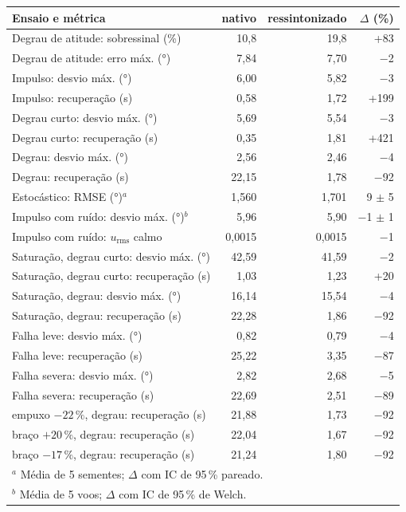 \begin{tabular}{lrrr}
\toprule
Ensaio e métrica & nativo & ressintonizado & $\Delta$ (\%) \\
\midrule
Degrau de atitude: sobressinal (\%) & 10,8 & 19,8 & +83 \\
Degrau de atitude: erro máx. (\si{\degree}) & 7,84 & 7,70 & $-$2 \\
Impulso: desvio máx. (\si{\degree}) & 6,00 & 5,82 & $-$3 \\
Impulso: recuperação (\si{\second}) & 0,58 & 1,72 & +199 \\
Degrau curto: desvio máx. (\si{\degree}) & 5,69 & 5,54 & $-$3 \\
Degrau curto: recuperação (\si{\second}) & 0,35 & 1,81 & +421 \\
Degrau: desvio máx. (\si{\degree}) & 2,56 & 2,46 & $-$4 \\
Degrau: recuperação (\si{\second}) & 22,15 & 1,78 & $-$92 \\
Estocástico: RMSE (\si{\degree})$^{a}$ & 1,560 & 1,701 & 9 $\pm$ 5 \\
Impulso com ruído: desvio máx. (\si{\degree})$^{b}$ & 5,96 & 5,90 & $-$1 $\pm$ 1 \\
Impulso com ruído: $u_\mathrm{rms}$ calmo & 0,0015 & 0,0015 & $-$1 \\
Saturação, degrau curto: desvio máx. (\si{\degree}) & 42,59 & 41,59 & $-$2 \\
Saturação, degrau curto: recuperação (\si{\second}) & 1,03 & 1,23 & +20 \\
Saturação, degrau: desvio máx. (\si{\degree}) & 16,14 & 15,54 & $-$4 \\
Saturação, degrau: recuperação (\si{\second}) & 22,28 & 1,86 & $-$92 \\
Falha leve: desvio máx. (\si{\degree}) & 0,82 & 0,79 & $-$4 \\
Falha leve: recuperação (\si{\second}) & 25,22 & 3,35 & $-$87 \\
Falha severa: desvio máx. (\si{\degree}) & 2,82 & 2,68 & $-$5 \\
Falha severa: recuperação (\si{\second}) & 22,69 & 2,51 & $-$89 \\
empuxo $-22\,\%$, degrau: recuperação (\si{\second}) & 21,88 & 1,73 & $-$92 \\
braço $+20\,\%$, degrau: recuperação (\si{\second}) & 22,04 & 1,67 & $-$92 \\
braço $-17\,\%$, degrau: recuperação (\si{\second}) & 21,24 & 1,80 & $-$92 \\
\bottomrule
\multicolumn{4}{l}{\footnotesize $^{a}$ Média de 5 sementes; $\Delta$ com IC de 95\,\% pareado.} \\
\multicolumn{4}{l}{\footnotesize $^{b}$ Média de 5 voos; $\Delta$ com IC de 95\,\% de Welch.} \\
\end{tabular}
